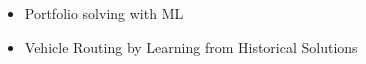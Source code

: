 \documentclass{article}
\begin{document}
\begin{itemize}
    \item Portfolio solving with ML~\cite{satzilla08}
    \item  Vehicle Routing by Learning from Historical Solutions~\cite{canoy-cp19}
\end{itemize}



\end{document}
